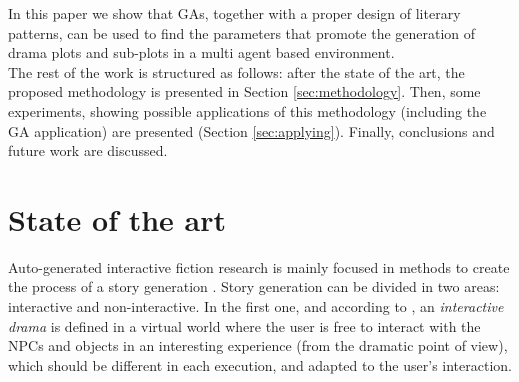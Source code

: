 \documentclass{sig-alternate}
\begin{document}

In this paper we show that GAs, together with a proper design of
literary patterns, can be used to find the parameters that promote the
generation of drama plots and sub-plots in a multi agent based
environment.\\


The rest of the work is structured as follows: after the state of the art, the proposed methodology is presented in Section \ref{sec:methodology}. Then, some experiments, showing possible applications of this methodology (including the GA application) are presented (Section \ref{sec:applying}). Finally, conclusions and future work are discussed.

%
%


\section{State of the art}
\label{sec:soa}


Auto-generated interactive fiction research is mainly focused in
methods to create the process of a story generation
\cite{nairat2011character}. Story generation can be divided in two %
areas: interactive and non-interactive. In the first one, and
according to \cite{ReviewArinbjarnar09}, an {\em interactive drama} is
defined in a virtual world where the user is free to interact with
the NPCs and objects in an interesting experience (from the dramatic point of view),
 which should be different in each execution, and adapted to the user's interaction. %
\end{document}
